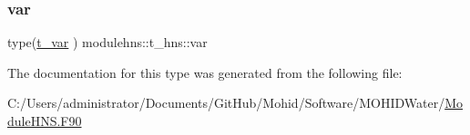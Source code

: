 \subsubsection{\texorpdfstring{var}{var}}
{\footnotesize\ttfamily type(\mbox{\hyperlink{structmodulehns_1_1t__var}{t\+\_\+var}} ) modulehns\+::t\+\_\+hns\+::var\hspace{0.3cm}{\ttfamily [private]}}



The documentation for this type was generated from the following file\+:\begin{DoxyCompactItemize}
\item 
C\+:/\+Users/administrator/\+Documents/\+Git\+Hub/\+Mohid/\+Software/\+M\+O\+H\+I\+D\+Water/\mbox{\hyperlink{_module_h_n_s_8_f90}{Module\+H\+N\+S.\+F90}}\end{DoxyCompactItemize}
